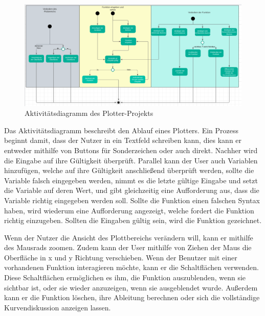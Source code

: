 \documentclass[a4paper]{article}
\begin{document}
\begin{figure}[ht]
	\centering
	\includegraphics[width=1\textwidth]{Resources/aktivitaetsdiagramm.png}
	\caption{Aktivitätsdiagramm des Plotter-Projekts}
	\label{fig:aktivitaetsdiagramm}
\end{figure}

Das Aktivitätsdiagramm beschreibt den Ablauf eines Plotters. Ein Prozess beginnt damit, dass der Nutzer in ein Textfeld schreiben kann, dies kann er entweder mithilfe von Buttons für Sonderzeichen oder auch direkt. Nachher wird die Eingabe auf ihre Gültigkeit überprüft.
Parallel kann der User auch Variablen hinzufügen, welche auf ihre Gültigkeit anschließend überprüft werden, sollte die Variable falsch eingegeben werden, nimmt es die letzte gültige Eingabe und setzt die Variable auf deren Wert, und gibt gleichzeitig eine Aufforderung aus, dass die Variable richtig eingegeben werden soll. Sollte die Funktion einen falschen Syntax haben, wird wiederum eine Aufforderung angezeigt, welche fordert die Funktion richtig einzugeben. Sollten die Eingaben gültig sein, wird die Funktion gezeichnet.

Wenn der Nutzer die Ansicht des Plottbereichs verändern will, kann er mithilfe des Mausrads zoomen. Zudem kann der User mithilfe von Ziehen der Maus die Oberfläche in x und y Richtung verschieben.
Wenn der Benutzer mit einer vorhandenen Funktion interagieren möchte, kann er die Schaltflächen verwenden. Diese Schaltflächen ermöglichen es ihm, die Funktion auszublenden, wenn sie sichtbar ist, oder sie wieder anzuzeigen, wenn sie ausgeblendet wurde. Außerdem kann er die Funktion löschen, ihre Ableitung berechnen oder sich die vollständige Kurvendiskussion anzeigen lassen.


\newpage
\end{document}
